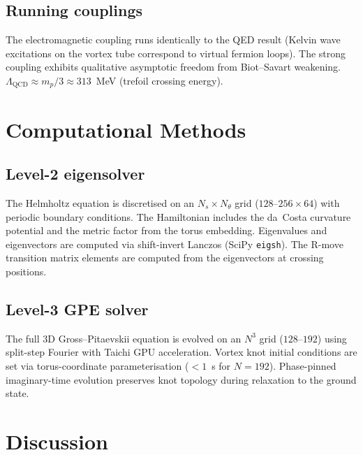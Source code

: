 \documentclass[11pt,a4paper]{article}
\begin{document}
\subsection{Running couplings}

The electromagnetic coupling runs identically to the QED result
(Kelvin wave excitations on the vortex tube correspond to virtual
fermion loops).  The strong coupling exhibits qualitative
asymptotic freedom from Biot--Savart weakening.
$\Lambda_{\text{QCD}} \approx m_p/3 \approx 313$~MeV (trefoil
crossing energy).


\section{Computational Methods}
\label{sec:methods}

\subsection{Level-2 eigensolver}

The Helmholtz equation is discretised on an
$N_s \times N_\theta$ grid ($128$--$256 \times 64$) with periodic
boundary conditions.  The Hamiltonian includes the da~Costa
curvature potential and the metric factor from the torus
embedding.  Eigenvalues and eigenvectors are computed via
shift-invert Lanczos (SciPy \texttt{eigsh}).  The R-move
transition matrix elements are computed from the eigenvectors
at crossing positions.

\subsection{Level-3 GPE solver}

The full 3D Gross--Pitaevskii equation is evolved on an
$N^3$ grid ($128$--$192$) using split-step Fourier with
Taichi GPU acceleration.  Vortex knot initial conditions are
set via torus-coordinate parameterisation ($< 1$~s for
$N = 192$).  Phase-pinned imaginary-time evolution preserves
knot topology during relaxation to the ground state.


\section{Discussion}
\label{sec:discussion}
\end{document}

